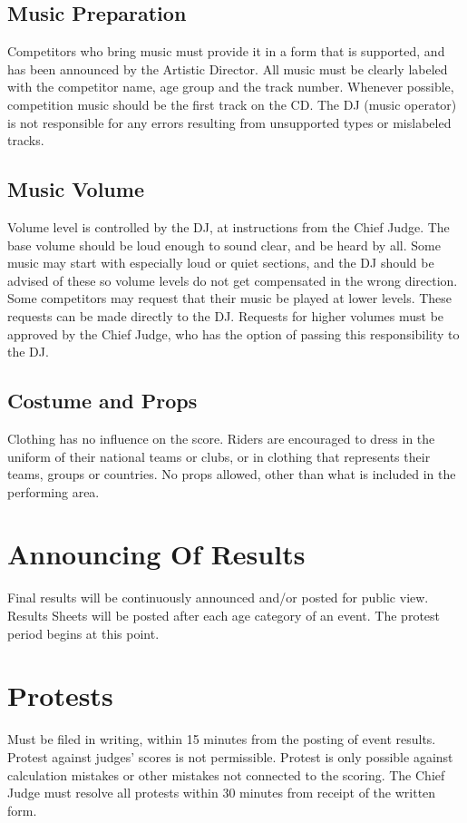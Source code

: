 \subsection{Music Preparation}
Competitors who bring music must provide it in a form that is supported, and has been announced by the Artistic Director.
All music must be clearly labeled with the competitor name, age group and the track number.
Whenever possible, competition music should be the first track on the CD.
The DJ (music operator) is not responsible for any errors resulting from unsupported types or mislabeled tracks.

\subsection{Music Volume}
Volume level is controlled by the DJ, at instructions from the Chief Judge.
The base volume should be loud enough to sound clear, and be heard by all.
Some music may start with especially loud or quiet sections, and the DJ should be advised of these so volume levels do not get compensated in the wrong direction.
Some competitors may request that their music be played at lower levels.
These requests can be made directly to the DJ.
Requests for higher volumes must be approved by the Chief Judge, who has the option of passing this responsibility to the DJ.

\subsection{Costume and Props}
Clothing has no influence on the score.
Riders are encouraged to dress in the uniform of their national teams or clubs, or in clothing that represents their teams, groups or countries.
No props allowed, other than what is included in the performing area.

\section{Announcing Of Results}
Final results will be continuously announced and/or posted for public view.
Results Sheets will be posted after each age category of an event.
The protest period begins at this point.

\section{Protests}
Must be filed in writing, within 15 minutes from the posting of event results.
Protest against judges' scores is not permissible.
Protest is only possible against calculation mistakes or other mistakes not connected to the scoring.
The Chief Judge must resolve all protests within 30 minutes from receipt of the written form.

